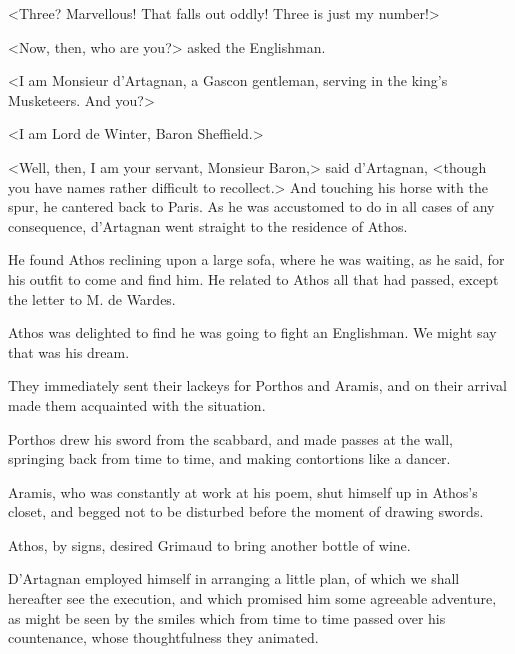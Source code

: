 <Three? Marvellous! That falls out oddly! Three is just my number!> 

<Now, then, who are you?> asked the Englishman. 

<I am Monsieur d'Artagnan, a Gascon gentleman, serving in the king's Musketeers. And you?> 

<I am Lord de Winter, Baron Sheffield.> 

<Well, then, I am your servant, Monsieur Baron,> said d'Artagnan, <though you have names rather difficult to recollect.> And touching his horse with the spur, he cantered back to Paris. As he was accustomed to do in all cases of any consequence, d'Artagnan went straight to the residence of Athos. 

He found Athos reclining upon a large sofa, where he was waiting, as he said, for his outfit to come and find him. He related to Athos all that had passed, except the letter to M. de Wardes. 

Athos was delighted to find he was going to fight an Englishman. We might say that was his dream. 

They immediately sent their lackeys for Porthos and Aramis, and on their arrival made them acquainted with the situation. 

Porthos drew his sword from the scabbard, and made passes at the wall, springing back from time to time, and making contortions like a dancer. 

Aramis, who was constantly at work at his poem, shut himself up in Athos's closet, and begged not to be disturbed before the moment of drawing swords. 

Athos, by signs, desired Grimaud to bring another bottle of wine. 

D'Artagnan employed himself in arranging a little plan, of which we shall hereafter see the execution, and which promised him some agreeable adventure, as might be seen by the smiles which from time to time passed over his countenance, whose thoughtfulness they animated.